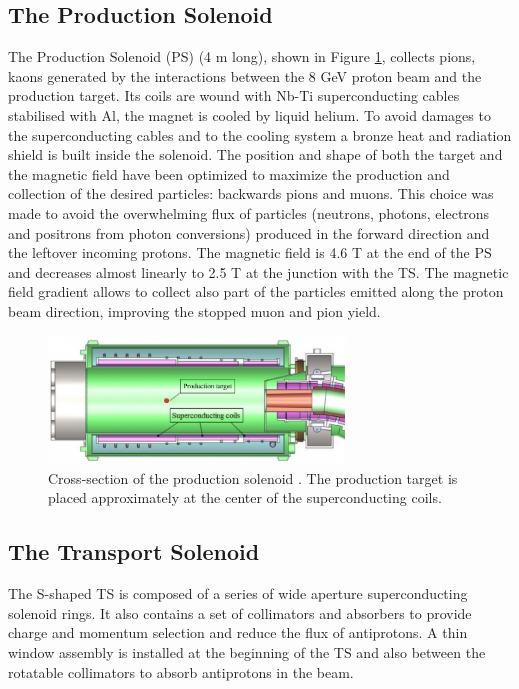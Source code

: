 \subsection{The Production Solenoid}
The Production Solenoid (PS) (4 m long), shown in Figure 
\ref{fig:PS}, collects pions, 
kaons generated by the interactions between the 8 GeV 
proton beam and the production target. 
Its coils are wound with Nb-Ti
superconducting cables stabilised with Al,  
the magnet is cooled by liquid helium.
To avoid damages to the 
superconducting cables and
to the cooling system a bronze heat and radiation shield 
is built inside the solenoid. 
The position and shape of both the target and the magnetic 
field have been optimized to
maximize the production and collection of the 
desired particles: backwards pions and
muons. This choice was made to avoid the overwhelming
flux of particles (neutrons, photons, electrons and 
positrons from photon conversions) produced in the forward 
direction and the leftover incoming protons. 
The magnetic field is 4.6 T at the end of the PS and 
decreases almost linearly to 2.5 T at the
junction with the TS.
The magnetic field gradient allows to collect also part of the particles 
emitted along the proton beam direction, improving 
the stopped muon and pion yield.


\begin{figure}[!h]
    \centering
    \includegraphics[width =0.7\textwidth]{figures/png/800px-Production_solenoid.png}
    \caption[The cross-section of the production solenoid.]{Cross-section of the production solenoid \cite{6376120}.
    The production target is placed approximately at the center of the superconducting coils.}
    \label{fig:PS}
    \end{figure}
\subsection{The Transport Solenoid}
The S-shaped TS is composed of a series of wide aperture superconducting
solenoid rings. It also contains a set of collimators and absorbers 
to provide charge and 
momentum selection and reduce the flux of antiprotons.
A thin window assembly is installed at the 
beginning of the TS and also between the rotatable collimators 
to absorb antiprotons in 
the beam. 

